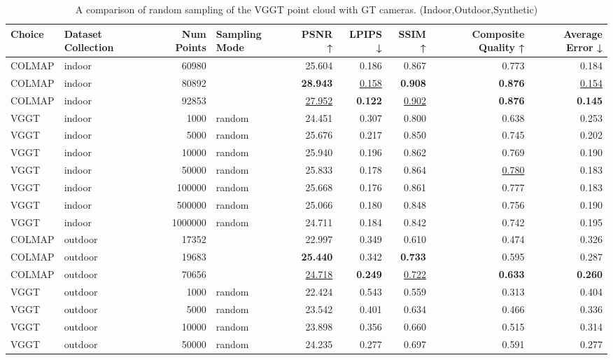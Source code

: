 \begin{table}[H]
\caption{A comparison of random sampling of the VGGT point cloud with GT cameras. (Indoor,Outdoor,Synthetic)}
\label{tab:03_random_gt_cams_indoor,outdoor,synthetic}
\centering
\scriptsize
\begin{tabular}{llrlrrrrr}
\toprule
Choice & Dataset Collection & Num Points & Sampling Mode & PSNR ↑ & LPIPS ↓ & SSIM ↑ & Composite Quality ↑ & Average Error ↓ \\
\midrule
COLMAP & indoor & 60980 &  & 25.604 & 0.186 & 0.867 & 0.773 & 0.184 \\
COLMAP & indoor & 80892 &  & \textbf{28.943} & \underline{0.158} & \textbf{0.908} & \textbf{0.876} & \underline{0.154} \\
COLMAP & indoor & 92853 &  & \underline{27.952} & \textbf{0.122} & \underline{0.902} & \textbf{0.876} & \textbf{0.145} \\
VGGT & indoor & 1000 & random & 24.451 & 0.307 & 0.800 & 0.638 & 0.253 \\
VGGT & indoor & 5000 & random & 25.676 & 0.217 & 0.850 & 0.745 & 0.202 \\
VGGT & indoor & 10000 & random & 25.940 & 0.196 & 0.862 & 0.769 & 0.190 \\
VGGT & indoor & 50000 & random & 25.833 & 0.178 & 0.864 & \underline{0.780} & 0.183 \\
VGGT & indoor & 100000 & random & 25.668 & 0.176 & 0.861 & 0.777 & 0.183 \\
VGGT & indoor & 500000 & random & 25.066 & 0.180 & 0.848 & 0.756 & 0.190 \\
VGGT & indoor & 1000000 & random & 24.711 & 0.184 & 0.842 & 0.742 & 0.195 \\
\midrule
COLMAP & outdoor & 17352 &  & 22.997 & 0.349 & 0.610 & 0.474 & 0.326 \\
COLMAP & outdoor & 19683 &  & \textbf{25.440} & 0.342 & \textbf{0.733} & 0.595 & 0.287 \\
COLMAP & outdoor & 70656 &  & \underline{24.718} & \textbf{0.249} & \underline{0.722} & \textbf{0.633} & \textbf{0.260} \\
VGGT & outdoor & 1000 & random & 22.424 & 0.543 & 0.559 & 0.313 & 0.404 \\
VGGT & outdoor & 5000 & random & 23.542 & 0.401 & 0.634 & 0.466 & 0.336 \\
VGGT & outdoor & 10000 & random & 23.898 & 0.356 & 0.660 & 0.515 & 0.314 \\
VGGT & outdoor & 50000 & random & 24.235 & 0.277 & 0.697 & 0.591 & 0.277 \\

\end{tabular}
\end{table}
